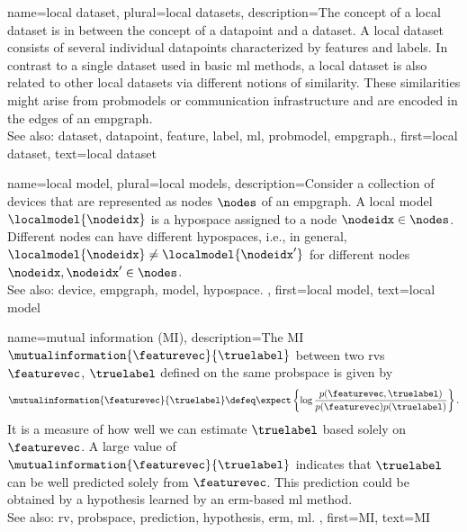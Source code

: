 	
{name={local dataset}, plural={local datasets}, 
	description={The concept of a local \gls{dataset} is 
		in between the concept of a \gls{datapoint} and a \gls{dataset}. A local \gls{dataset} consists of several 
		individual \glspl{datapoint} characterized by \glspl{feature} and \glspl{label}. 
		In contrast to a single \gls{dataset} used in basic \gls{ml} methods, a local \gls{dataset} is also 
		related to other local \glspl{dataset} via different notions of similarity. These similarities 
		might arise from \glspl{probmodel} or communication infrastructure and 
		are encoded in the edges of an \gls{empgraph}.
				\\
		See also: \gls{dataset}, \gls{datapoint}, \gls{feature}, \gls{label}, \gls{ml}, \gls{probmodel}, \gls{empgraph}.},
		first={local dataset},
		text={local dataset}
}
	
{name={local model}, plural={local models}, 
	description={Consider a collection of \glspl{device} that are represented 
		as nodes $\nodes$ of an \gls{empgraph}. A local \gls{model} $\localmodel{\nodeidx}$ 
		is a \gls{hypospace} assigned to a node $\nodeidx \in \nodes$. Different nodes can have 
		different \glspl{hypospace}, i.e., in general, $\localmodel{\nodeidx} \neq \localmodel{\nodeidx'}$ 
		for different nodes $\nodeidx, \nodeidx' \in \nodes$. 
				\\
		See also: \gls{device}, \gls{empgraph}, \gls{model}, \gls{hypospace}. },
	first={local model},
	text={local model}
}
	
{name={mutual information (MI)},
 	description={The MI $\mutualinformation{\featurevec}{\truelabel}$ 
 		between two \glspl{rv} $\featurevec$, $\truelabel$ defined on the same \gls{probspace} 
 		is given by \cite{coverthomas} $$\mutualinformation{\featurevec}{\truelabel} \defeq 
		\expect \left\{ \log \frac{p (\featurevec,\truelabel)}{p(\featurevec)p(\truelabel)} \right\}.$$ 
		It is a measure of how well we can estimate $\truelabel$ based 
		solely on $\featurevec$. A large value of $\mutualinformation{\featurevec}{\truelabel}$ indicates that 
		$\truelabel$ can be well predicted solely from $\featurevec$. This \gls{prediction} could be obtained by a 
		\gls{hypothesis} learned by an \gls{erm}-based \gls{ml} method. 
				\\
		See also: \gls{rv}, \gls{probspace}, \gls{prediction}, \gls{hypothesis}, \gls{erm}, \gls{ml}. }, 
	first={MI}, 
	text={MI} 
}

